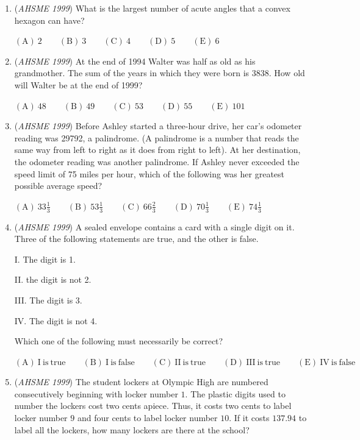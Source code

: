 \begin{enumerate}
	\item (\textit{AHSME 1999}) What is the largest number of acute angles that a convex hexagon can have? 


 $\mathrm{(A) \ }2 \qquad \mathrm{(B) \ }3 \qquad \mathrm{(C) \ }4 \qquad \mathrm{(D) \ }5 \qquad \mathrm{(E) \ }6$


	\item (\textit{AHSME 1999}) At the end of 1994 Walter was half as old as his grandmother. The sum of the years in which they were born is 3838. How old will Walter be at the end of 1999?


 $\mathrm{(A) \ } 48 \qquad \mathrm{(B) \ }49 \qquad \mathrm{(C) \ }53 \qquad \mathrm{(D) \ }55 \qquad \mathrm{(E) \ } 101$


	\item (\textit{AHSME 1999}) Before Ashley started a three-hour drive, her car's odometer reading was 29792, a palindrome. (A palindrome is a number that reads the same way from left to right as it does from right to left). At her destination, the odometer reading was another palindrome. If Ashley never exceeded the speed limit of 75 miles per hour, which of the following was her greatest possible average speed?


 $\mathrm{(A) \ } 33\frac 13 \qquad \mathrm{(B) \ }53\frac 13 \qquad \mathrm{(C) \ }66\frac 23 \qquad \mathrm{(D) \ }70\frac 13 \qquad \mathrm{(E) \ } 74\frac 13$


	\item (\textit{AHSME 1999}) A sealed envelope contains a card with a single digit on it. Three of the following statements are true, and the other is false.


 I. The digit is 1.


 II. the digit is not 2. 


 III. The digit is 3.


 IV. The digit is not 4.


 Which one of the following must necessarily be correct?


 $\mathrm{(A) \ I\ is\ true} \qquad \mathrm{(B) \ I\ is\ false} \qquad \mathrm{(C) \ II\ is\ true} \qquad \mathrm{(D) \ III\ is\ true} \qquad \mathrm{(E) \ IV\ is\ false}$


	\item (\textit{AHSME 1999}) The student lockers at Olympic High are numbered consecutively beginning with locker number $1$. The plastic digits used to number the lockers cost two cents apiece. Thus, it costs two cents to label locker number $9$ and four cents to label locker number $10$. If it costs $137.94$ to label all the lockers, how many lockers are there at the school?



\end{enumerate}
